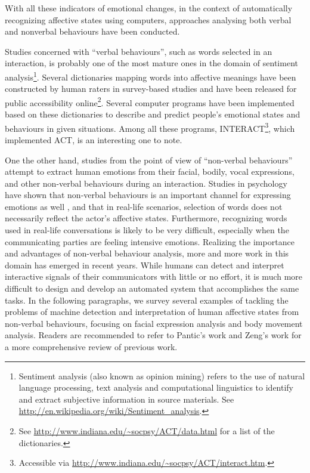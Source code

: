 With all these indicators of emotional changes, in the context of automatically recognizing affective states using computers, approaches analysing both verbal and nonverbal behaviours have been conducted.

Studies concerned with ``verbal behaviours'', such as words selected in an interaction, is probably one of the most mature ones in the domain of sentiment analysis\footnote{Sentiment analysis (also known as opinion mining) refers to the use of natural language processing, text analysis and computational linguistics to identify and extract subjective information in source materials. See \url{http://en.wikipedia.org/wiki/Sentiment_analysis}.}. Several dictionaries mapping words into affective meanings have been constructed by human raters in survey-based studies and have been released for public accessibility online\footnote{See \url{http://www.indiana.edu/~socpsy/ACT/data.html} for a list of the dictionaries.}. Several computer programs have been implemented based on these dictionaries to describe and predict people's emotional states and behaviours in given situations. Among all these programs, INTERACT\footnote{Accessible via \url{http://www.indiana.edu/~socpsy/ACT/interact.htm}.}, which implemented ACT, is an interesting one to note.

One the other hand, studies from the point of view of ``non-verbal behaviours'' attempt to extract human emotions from their facial, bodily, vocal expressions, and other non-verbal behaviours during an interaction. Studies in psychology have shown that non-verbal behaviours is an important channel for expressing emotions as well \cite{schroder2013culture}, and that in real-life scenarios, selection of words does not necessarily reflect the actor's affective states. Furthermore, recognizing words used in real-life conversations is likely to be very difficult, especially when the communicating parties are feeling intensive emotions. Realizing the importance and advantages of non-verbal behaviour analysis, more and more work in this domain has emerged in recent years. While humans can detect and interpret interactive signals of their communicators with little or no effort, it is much more difficult to design and develop an automated system that accomplishes the same tasks. In the following paragraphs, we survey several examples of tackling the problems of machine detection and interpretation of human affective states from non-verbal behaviours, focusing on facial expression analysis and body movement analysis. Readers are recommended to refer to Pantic's work \cite{pantic2003toward} and Zeng's work \cite{zeng2009survey} for a more comprehensive review of previous work.

